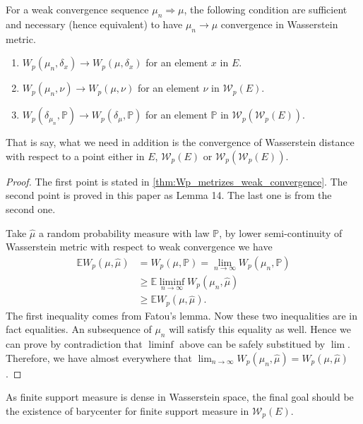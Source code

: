 \begin{prop}
	For a weak convergence sequence $\mu_n \Rightarrow \mu$, the following condition are sufficient and necessary (hence equivalent) to have $\mu_n \rightarrow \mu$ convergence in Wasserstein metric.
	\begin{enumerate}
		\item $W_p(\mu_n, \delta_x) \rightarrow W_p(\mu, \delta_x)$ for an element $x$ in $E$.
		\item $W_p(\mu_n, \nu) \rightarrow W_p(\mu, \nu)$ for an element $\nu$ in $\mathcal{W}_p(E)$.
		\item $W_p(\delta_{\mu_n}, \mathbb{P}) \rightarrow W_p(\delta_\mu, \mathbb{P})$ for an element $\mathbb{P}$ in $\mathcal{W}_p(\mathcal{W}_p(E))$.
	\end{enumerate}
\end{prop}

That is say, what we need in addition is the convergence of Wasserstein distance with respect to a point either in $E$, $\mathcal{W}_p(E)$ or $\mathcal{W}_p(\mathcal{W}_p(E))$.

\begin{proof}
	The first point is stated in \cref{thm:Wp_metrizes_weak_convergence}. The second point is proved in this paper as Lemma 14. The last one is from the second one.

	Take $\hat{\mu}$ a random probability measure with law $\mathbb{P}$, by lower semi-continuity of Wasserstein metric with respect to weak convergence we have
	\begin{align*}
		\mathbb{E}W_p(\mu, \hat{\mu}) & =W_p(\mu, \mathbb{P})=\lim_{n \rightarrow \infty} W_p(\mu_n, \mathbb{P}) \\
		                              & \geq \mathbb{E}\liminf_{n \rightarrow \infty} W_p(\mu_n, \hat{\mu})           \\
		                              & \geq \mathbb{E}W_p(\mu, \hat{\mu}).
	\end{align*}
	The first inequality comes from Fatou's lemma. Now these two inequalities are in fact equalities. An subsequence of $\mu_n$ will satisfy this equality as well. Hence we can prove by contradiction that $\liminf$ above can be safely substitued by $\lim$.
	Therefore, we have almost everywhere that $\lim_{n \rightarrow \infty} W_p(\mu_n, \hat{\mu})=W_p(\mu, \hat{\mu})$.
\end{proof}

As finite support measure is dense in Wasserstein space, the final goal should be the existence of barycenter for finite support measure in $\mathcal{W}_p(E)$.

